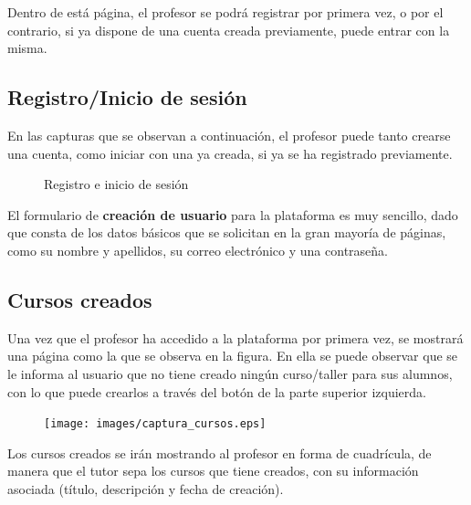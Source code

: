 Dentro de está página, el profesor se podrá registrar por primera vez, o por el contrario, si ya dispone de una cuenta creada previamente, puede entrar con la misma.


\subsection{Registro/Inicio de sesión}
\label{1:sec:2}

En las capturas que se observan a continuación, el profesor puede tanto crearse una cuenta, como iniciar con una ya creada, si ya se ha registrado previamente. 
\begin{figure}[!th]%
    \centering
    \qquad
    \caption{Registro e inicio de sesión}%
    \label{fig:12}%
\end{figure}

El formulario de \textbf{creación de usuario} para la plataforma es muy sencillo, dado que consta de los datos básicos que se solicitan en la gran mayoría de páginas, como su nombre y apellidos, su correo electrónico y una contraseña.


\subsection{Cursos creados}
\label{1:sec:3}

Una vez que el profesor ha accedido a la plataforma por primera vez, se mostrará una página como la que se observa en la figura. En ella se puede observar que se le informa al usuario que no tiene creado ningún curso/taller para sus alumnos, 
con lo que puede crearlos a través del botón de la parte superior izquierda.

\newpage
\begin{figure}[!th]
\begin{center}
\texttt{[image: images/captura\_cursos.eps]}
\label{fig:13}
\end{center}
\end{figure}

Los cursos creados se irán mostrando al profesor en forma de cuadrícula, de manera que el tutor sepa los cursos que tiene creados, con su información asociada (título, descripción y fecha de creación).

